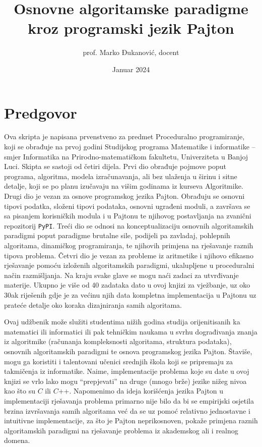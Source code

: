 \documentclass[b5paper, utf8, 11pt, colorlinks]{book}
\begin{document}
\author{prof. Marko Đukanović, docent}
\title{Osnovne algoritamske paradigme kroz programski jezik Pajton}
\date{Januar 2024}

 
\maketitle
 
\tableofcontents
 \clearpage
 \setcounter{page}{1}

\chapter*{Predgovor}

Ova skripta je napisana prvenstveno za predmet Proceduralno programi\-ranje, koji se obrađuje na prvoj godini Studijskog programa Matematike i informa\-tike -- smjer Informatika na Prirodno-matematičkom fakultetu, Univerziteta u Banjoj Luci. Skipta se sastoji od četiri dijela. Prvi dio obrađuje pojmove poput  programa, algoritma, modela izraču\-navanja, ali bez ulaženja u širinu i sitne detalje, koji se po planu izučavaju na višim godinama iz kurseva Algoritmike. Drugi dio je vezan za osnove programskog jezika Pajton. Obrađuju se  osnovni tipovi podatka, složeni tipovi podataka, osnovni ugrađeni moduli, a završava se sa pisanjem korisničkih modula i u Pajtonu te njihovog postavljanja na zvanični repozitorij \texttt{PyPI}. Treći dio se odnosi na konceptuali\-zaciju osnovnih algoritamskih paradigmi poput paradigme brutalne sile, podijeli pa zavladaj, pohlepnih algoritama, dinami\-čkog programiranja, te njihovih primjena na rješava\-nje raznih tipova proble\-ma. Četvri dio je vezan za probleme iz aritmetike i njihovo efikasno rješava\-nje pomoću izloženih algoritamskih paradigmi, ukalupljene u proceduralni način razmišljanja.  Na kraju svake glave se mogu naći zadaci za utvrđivanje materije. Ukupno je više od 40 zadataka dato u ovoj knjizi za vježbanje, uz oko 30ak riješenih gdje je za većinu njih data kompletna implementacija u Pajtonu uz prateće detalje oko koraka dizajniranja samih algoritama. 
 
 
 Ovaj udžbenik može služiti studentima nižih godina studija orijenitisanih ka matematici ili informatici ili pak tehničkim naukama u svrhu dograđivanja znanja iz algoritmike (računanja kompleksnosti algoritama, struktura poda\-taka), osnovnih algoritamskih paradigmi te osnova programskog jezika Pajton. Štaviše, mogu ga koristiti i talentovani učenici srednjih škola koji se priprema\-ju za takmičenja iz informatike. Naime, implementacije problema koje su date u ovoj knjizi se vrlo lako mogu ``prepjevati'' na druge (mnogo brže) jezike nižeg nivoa kao što su $C$ ili $C$++. Napomenimo da ideja korišćenja jezika Pajton u implementaciji rješavanja problema primarno nije bilo da bi se  empirijski osjetila brzina izvršavanja samih algoritama već da se uz pomoć relativno jednostavne i intuitivne implementacije, za što je Pajton neprikosnoven, pokaže primjena raznih algoritamskih paradigmi na rješavanje problema iz akademskog ali i realnog domena.
 
\end{document}
